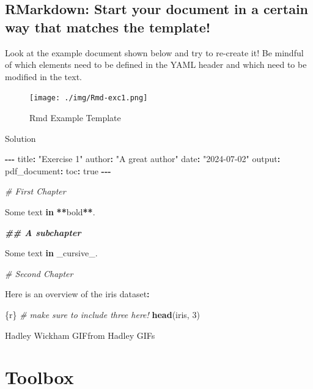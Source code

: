 \documentclass[
]{book}
\newenvironment{Shaded}{\begin{snugshade}}{\end{snugshade}}
\newcommand{\CommentTok}[1]{\textcolor[rgb]{0.56,0.35,0.01}{\textit{#1}}}
\newcommand{\ControlFlowTok}[1]{\textcolor[rgb]{0.13,0.29,0.53}{\textbf{#1}}}
\newcommand{\DecValTok}[1]{\textcolor[rgb]{0.00,0.00,0.81}{#1}}
\newcommand{\DocumentationTok}[1]{\textcolor[rgb]{0.56,0.35,0.01}{\textbf{\textit{#1}}}}
\newcommand{\FunctionTok}[1]{\textcolor[rgb]{0.13,0.29,0.53}{\textbf{#1}}}
\newcommand{\NormalTok}[1]{#1}
\newcommand{\SpecialCharTok}[1]{\textcolor[rgb]{0.81,0.36,0.00}{\textbf{#1}}}
\newcommand{\StringTok}[1]{\textcolor[rgb]{0.31,0.60,0.02}{#1}}
\begin{document}
\section{RMarkdown: Start your document in a certain way that matches the template!}\label{rmarkdown-start-your-document-in-a-certain-way-that-matches-the-template}

Look at the example document shown below and try to re-create it!
Be mindful of which elements need to be defined in the YAML header and which need to be modified in the text.

\begin{figure}
\centering
\texttt{[image: ./img/Rmd-exc1.png]}
\caption{Rmd Example Template}
\end{figure}

Solution

\begin{Shaded}
\begin{Highlighting}[]
\SpecialCharTok{{-}{-}{-}}
\NormalTok{title}\SpecialCharTok{:} \StringTok{"Exercise 1"}
\NormalTok{author}\SpecialCharTok{:} \StringTok{"A great author"}
\NormalTok{date}\SpecialCharTok{:} \StringTok{"2024{-}07{-}02"}
\NormalTok{output}\SpecialCharTok{:} 
\NormalTok{  pdf\_document}\SpecialCharTok{:}
\NormalTok{    toc}\SpecialCharTok{:}\NormalTok{ true}
\SpecialCharTok{{-}{-}{-}}

\CommentTok{\# First Chapter}

\NormalTok{Some text }\ControlFlowTok{in} \SpecialCharTok{**}\NormalTok{bold}\SpecialCharTok{**}\NormalTok{.}

\DocumentationTok{\#\# A subchapter}

\NormalTok{Some text }\ControlFlowTok{in}\NormalTok{ \_cursive\_.}

\CommentTok{\# Second Chapter}

\NormalTok{Here is an overview of the iris dataset}\SpecialCharTok{:}

\StringTok{\textasciigrave{}\textasciigrave{}}\NormalTok{\{r\} }\CommentTok{\# make sure to include three \textasciigrave{} here!}
\FunctionTok{head}\NormalTok{(iris, }\DecValTok{3}\NormalTok{)}
\StringTok{\textasciigrave{}\textasciigrave{}}
\end{Highlighting}
\end{Shaded}

Hadley Wickham GIFfrom Hadley GIFs

\chapter*{Toolbox}\label{toolbox}
\end{document}
